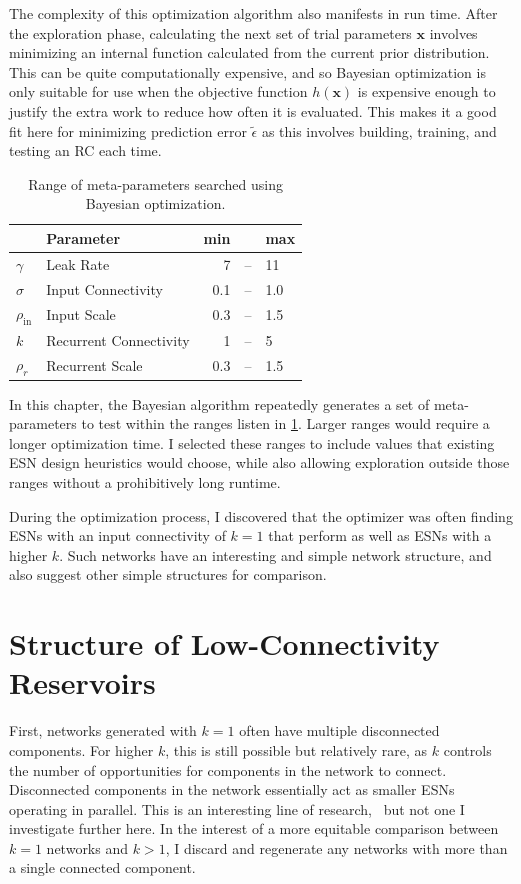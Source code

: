 The complexity of this optimization algorithm also manifests in run
time. After the exploration phase, calculating the next set of trial
parameters $\bm{x}$ involves minimizing an internal function
calculated from the current prior distribution. This can be quite
computationally expensive, and so Bayesian optimization is only
suitable for use when the objective function $h(\bm{x})$ is expensive
enough to justify the extra work to reduce how often it is
evaluated. This makes it a good fit here for minimizing prediction error
$\tilde{\epsilon}$ as this involves building, training, and testing
an RC each time.

\begin{table}
  \caption{Range of meta-parameters searched using Bayesian optimization.}
  \begin{tabular}{llrcl}
    & Parameter & min & & max \\
    \hline
    $\gamma$ & Leak Rate & 7 & -- & 11 \\
    $\sigma$ & Input Connectivity & 0.1 & -- & 1.0 \\
    $\rho_\text{in}$ & Input Scale & 0.3 & -- & 1.5 \\
    $k$ & Recurrent Connectivity & 1 & -- & 5 \\
    $\rho_r$ & Recurrent Scale & 0.3 & -- & 1.5 \\
  \end{tabular}%
  \label{tab:bayes-ranges}
\end{table}

In this chapter, the Bayesian algorithm repeatedly generates a set of
meta-parameters to test within the ranges listen in
\cref{tab:bayes-ranges}. Larger ranges would require a longer
optimization time. I selected these ranges to include values that
existing ESN design heuristics would choose, while also allowing
exploration outside those ranges without a prohibitively long runtime.

During the optimization process, I discovered that the optimizer was
often finding ESNs with an input connectivity of $k = 1$ that perform as well as ESNs with a
higher $k$. Such networks have an interesting and simple network
structure, and also suggest other simple structures for comparison.

\section{Structure of Low-Connectivity Reservoirs}

First, networks generated with $k = 1$ often have multiple
disconnected components. For higher $k$, this is still possible but
relatively rare, as $k$ controls the number of opportunities for
components in the network to connect. Disconnected components in the
network essentially act as smaller ESNs operating in parallel. This is an
interesting line of research,~\cite{pathak2018} but not one I
investigate further here. In the interest of a more equitable
comparison between $k = 1$ networks and $k > 1$, I discard and
regenerate any networks with more than a single connected component.

